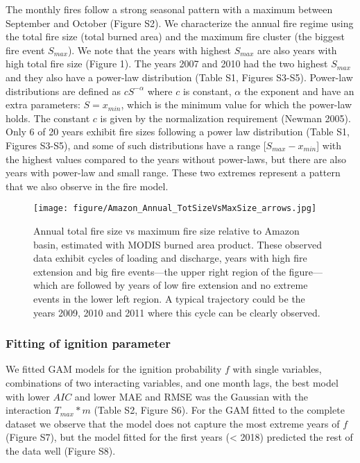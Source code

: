 \documentclass[
]{article}
\begin{document}
The monthly fires follow a strong seasonal pattern with a maximum
between September and October (Figure S2). We characterize the annual
fire regime using the total fire size (total burned area) and the
maximum fire cluster (the biggest fire event \(S_{max}\)). We note that
the years with highest \(S_{max}\) are also years with high total fire
size (Figure 1). The years 2007 and 2010 had the two highest \(S_{max}\)
and they also have a power-law distribution (Table S1, Figures S3-S5).
Power-law distributions are defined as \(c S^{-\alpha}\) where \(c\) is
constant, \(\alpha\) the exponent and have an extra parameters:
\(S=x_{min}\), which is the minimum value for which the power-law holds.
The constant \(c\) is given by the normalization requirement (Newman
2005). Only 6 of 20 years exhibit fire sizes following a power law
distribution (Table S1, Figures S3-S5), and some of such distributions
have a range {[}\(S_{max} - x_{min}\){]} with the highest values
compared to the years without power-laws, but there are also years with
power-law and small range. These two extremes represent a pattern that
we also observe in the fire model.

\begin{figure}
\centering
\texttt{[image: figure/Amazon\_Annual\_TotSizeVsMaxSize\_arrows.jpg]}
\caption{Annual total fire size vs maximum fire size relative to Amazon
basin, estimated with MODIS burned area product. These observed data
exhibit cycles of loading and discharge, years with high fire extension
and big fire events---the upper right region of the figure---which are
followed by years of low fire extension and no extreme events in the
lower left region. A typical trajectory could be the years 2009, 2010
and 2011 where this cycle can be clearly observed.}
\end{figure}

\subsubsection{Fitting of ignition
parameter}\label{fitting-of-ignition-parameter-1}

We fitted GAM models for the ignition probability \(f\) with single
variables, combinations of two interacting variables, and one month
lags, the best model with lower \(AIC\) and lower MAE and RMSE was the
Gaussian with the interaction \(T_{max} * m\) (Table S2, Figure S6). For
the GAM fitted to the complete dataset we observe that the model does
not capture the most extreme years of \(f\) (Figure S7), but the model
fitted for the first years (\textless{} 2018) predicted the rest of the
data well (Figure S8).
\end{document}
